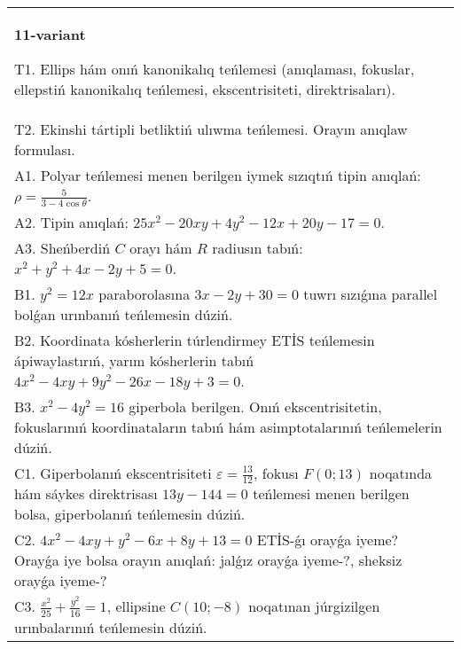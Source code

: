 \documentclass{article}
\begin{document}
\begin{tabular}{m{17cm}}
\textbf{11-variant}
\newline

T1. Ellips hám onıń kanonikalıq teńlemesi (anıqlaması, fokuslar, ellepstiń kanonikalıq teńlemesi, ekscentrisiteti, direktrisaları).\\

T2. Ekinshi tártipli betliktiń ulıwma teńlemesi. Orayın anıqlaw formulası.\\

A1. Polyar teńlemesi menen berilgen iymek sızıqtıń tipin anıqlań: $\rho=\frac{5}{3-4\cos\theta}$.\\

A2. Tipin anıqlań: $25 x^{2}-20 xy+4 y^{2}-12 x+20 y-17=0$.\\

A3. Sheńberdiń $C$ orayı hám $R$ radiusın tabıń: $x^2+y^2+4 x-2 y+5=0$.\\

B1. $y^{2} = 12x$ paraborolasına $3x - 2y + 30 = 0$ tuwrı sızıǵına parallel bolǵan urınbanıń teńlemesin dúziń.  \\

B2. Koordinata kósherlerin túrlendirmey ETİS teńlemesin ápiwaylastırıń, yarım kósherlerin tabıń $4x^{2} - 4xy + 9y^{2} - 26x - 18y + 3 = 0$.\\

B3. $x^{2} - 4y^{2} = 16$ giperbola berilgen. Onıń ekscentrisitetin, fokuslarınıń koordinataların tabıń hám asimptotalarınıń teńlemelerin dúziń.\\

C1. Giperbolanıń ekscentrisiteti $\varepsilon = \frac{13}{12}$, fokusı $F(0;13)$ noqatında hám sáykes direktrisası $13y - 144 = 0$ teńlemesi menen berilgen bolsa, giperbolanıń teńlemesin dúziń.  \\

C2. $4x^{2} - 4xy + y^{2} - 6x + 8y + 13 = 0$ ETİS-ǵı orayǵa iyeme? Orayǵa iye bolsa orayın anıqlań: jalǵız orayǵa iyeme-?, sheksiz orayǵa iyeme-?  \\

C3. $\frac{x^{2}}{25} + \frac{y^{2}}{16} = 1$, ellipsine $C(10; - 8)$ noqatınan júrgizilgen urınbalarınıń teńlemesin dúziń.  \\

\end{tabular}
\vspace{1cm}
\end{document}
